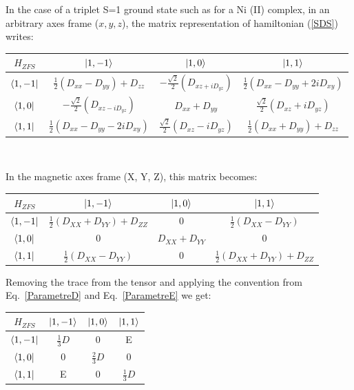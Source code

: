 \documentclass[12pt,a4paper]{report}
\numberwithin{equation}{section}
\begin{document}
In the case of a triplet S=1 ground state such as for a Ni (II) complex, in an arbitrary axes frame ($x,y,z$), the matrix representation of hamiltonian (\ref{SDS}) writes:
\begin{center}
    \begin{tabular}{ c | c c c}
        $H_{ZFS}$ & $\ket{1,-1}$ & $\ket{1,0} $& $\ket{1,1}$ \\
        \hline
        $\bra{1,-1} $&  $\frac{1}{2}(D_{xx}-D_{yy})+D_{zz}$ & $-\frac{\sqrt{2}}{2}(D_{xz+iD_{yz}}) $ & $\frac{1}{2}(D_{xx}-D_{yy}+2iD_{xy})$ \\
        $\bra{1,0}$ & $-\frac{\sqrt{2}}{2}(D_{xz-iD_{yz}})  $& $ D_{xx}+D_{yy}  $&$ \frac{\sqrt{2}}{2}(D_{xz}+iD_{yz})$ \\
        $\bra{1,1} $& $ \frac{1}{2}(D_{xx}-D_{yy}-2iD_{xy}) $& $\frac{\sqrt{2}}{2}(D_{xz}-iD_{yz})$  & $\frac{1}{2}(D_{xx}+D_{yy})+D_{zz} $ \\
    \end{tabular}\\
\end{center}
In the magnetic axes frame (X, Y, Z), this matrix becomes:
\begin{center}
\begin{tabular}{c | c c c}
    $H_{ZFS}$ & $\ket{1,-1}$ & $\ket{1,0} $& $\ket{1,1}$ \\
    \hline
    $\bra{1,-1}$ & $\frac{1}{2}(D_{XX}+D_{YY})+D_{ZZ}$ & 0 & $\frac{1}{2}(D_{XX}-D_{YY})$\\
    $\bra{1,0}$ & 0 & $D_{XX}+D_{YY}$ & 0\\
    $\bra{1,1}$ &  $\frac{1}{2}(D_{XX}-D_{YY})$ & 0 & $\frac{1}{2}(D_{XX}+D_{YY})+D_{ZZ}$
\end{tabular}
\end{center}
Removing the trace from the tensor and applying the convention from Eq.~\ref{ParametreD} and Eq.~\ref{ParametreE} we get:
\begin{center}
\begin{tabular}{c | c c c}
    $H_{ZFS}$ & $\ket{1,-1}$ & $\ket{1,0}$ & $\ket{1,1}$\\
    \hline
    $\bra{1,-1}$ & $\frac{1}{3}D$ & 0 & E\\
    $\bra{1,0}$ & 0 & $\frac{2}{3}D $& 0\\
    $\bra{1,1}$ & E & 0 & $\frac{1}{3}D$
\end{tabular}
\end{center}
\end{document}
